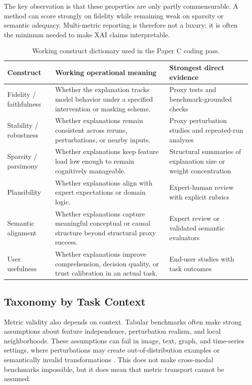 \documentclass[twoside,11pt]{article}
\begin{document}
The key observation is that these properties are only partly
commensurable. A method can score strongly on fidelity while remaining
weak on sparsity or semantic adequacy. Multi-metric reporting is
therefore not a luxury; it is often the minimum needed to make XAI
claims interpretable.

\begin{table}[t]
\centering
\caption{Working construct dictionary used in the Paper C coding pass.}
\begin{tabularx}{\linewidth}{l X X}
\toprule
\textbf{Construct} & \textbf{Working operational meaning} & \textbf{Strongest direct evidence} \\
\midrule
Fidelity / faithfulness & Whether the explanation tracks model behavior under a specified intervention or masking scheme. & Proxy tests and benchmark-grounded checks \\
Stability / robustness & Whether explanations remain consistent across reruns, perturbations, or nearby inputs. & Proxy perturbation studies and repeated-run analyses \\
Sparsity / parsimony & Whether explanations keep feature load low enough to remain cognitively manageable. & Structural summaries of explanation size or weight concentration \\
Plausibility & Whether explanations align with expert expectations or domain logic. & Expert-human review with explicit rubrics \\
Semantic alignment & Whether explanations capture meaningful conceptual or causal structure beyond structural proxy success. & Expert review or validated semantic evaluators \\
User usefulness & Whether explanations improve comprehension, decision quality, or trust calibration in an actual task. & End-user studies with task outcomes \\
\bottomrule
\end{tabularx}
\label{tab:constructs}
\end{table}

\subsection{Taxonomy by Task Context}

Metric validity also depends on context. Tabular benchmarks often make
strong assumptions about feature independence, perturbation realism, and
local neighborhoods. These assumptions can fail in image, text, graph,
and time-series settings, where perturbations may create
out-of-distribution examples or semantically invalid transformations
\citep{agarwal2023gnn_eval,proszewska2025bxaic}. This does not make
cross-modal benchmarks impossible, but it does mean that metric
transport cannot be assumed.
\end{document}
